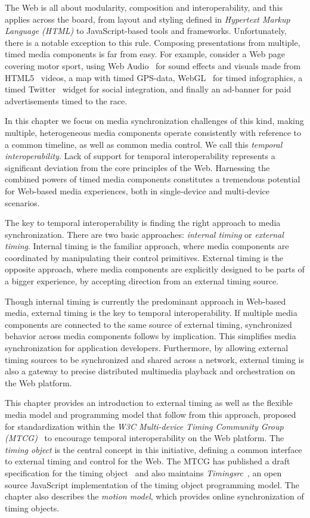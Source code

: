The Web is all about modularity, composition and interoperability, and this
applies across the board, from layout and styling defined in \emph{Hypertext
Markup Language (HTML)} to JavaScript-based tools and frameworks.
Unfortunately, there is a notable exception to this rule. Composing
presentations from multiple, timed media components is far from easy. For
example, consider a Web page covering motor sport, using Web
Audio~\cite{webaudio} for sound effects and visuals made from HTML5~\cite{html5} videos, a
map with timed GPS-data, WebGL~\cite{webgl} for timed infographics, a timed
Twitter~\cite{twitter} widget for social integration, and finally an ad-banner
for paid advertisements timed to the race.

In this chapter we focus on media synchronization challenges of this kind,
making multiple, heterogeneous media components operate consistently with
reference to a common timeline, as well as common media control. We call this
\emph{temporal interoperability}. Lack of support for temporal
interoperability represents a significant deviation from the core principles
of the Web. Harnessing the combined powers of timed media components
constitutes a tremendous potential for Web-based media experiences, both in
single-device and multi-device scenarios.

The key to temporal interoperability is finding the right approach to media
synchronization. There are two basic approaches: \emph{internal
timing} or \emph{external timing}. Internal timing
is the familiar approach, where media components are coordinated by
manipulating their control primitives. External timing is the
opposite approach, where media components are explicitly designed to be parts
of a bigger experience, by accepting direction from an external timing source.

Though internal timing is currently the predominant approach in Web-based media, 
external timing is the key to temporal interoperability.
If multiple media components are connected to the same source of external timing,
synchronized behavior across media components follows by implication. This
simplifies media synchronization for application developers. Furthermore,
by allowing external timing sources to be synchronized and shared across a
network, external timing is also a gateway to precise distributed multimedia
playback and orchestration on the Web platform.

This chapter provides an introduction to external timing as well as the
flexible media model and programming model that follow from this approach,
proposed for standardization within the \emph{W3C Multi-device Timing
Community Group (MTCG)}~\cite{mtcg} to encourage temporal interoperability on
the Web platform. The \emph{timing object} is the central concept in this
initiative, defining a common interface to external timing and control for the
Web. The MTCG has published a draft specification for the timing
object~\cite{timingobject} and also maintains
\emph{Timingsrc}~\cite{timingsrc}, an open source JavaScript implementation of
the timing object programming model. The chapter also describes the
\emph{motion model}, which provides online synchronization of timing objects.


